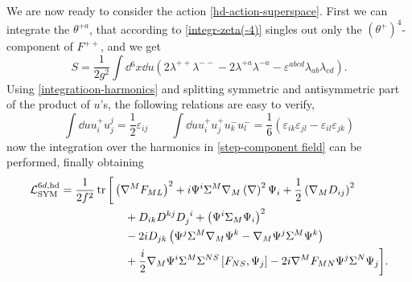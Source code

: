 


We are now ready to consider the action \eqref{hd-action-superspace}. First we can integrate the $\theta^{+a}$, that according to \eqref{integr-zeta(-4)} singles out only the $(\theta^+)^4$-component of $F^{++}$, and we get
\begin{equation}\label{step-component field}
S = \frac{1}{2 g^2}
\int \dd{^6 x} \dd{ u }
\left(
	2 \lambda^{++} \lambda^{--}
	-2 \lambda^{+a}  \lambda^{-a}
	- \varepsilon^{abcd} \lambda_{ab} \lambda_{cd}
\right).
\end{equation}
Using \eqref{integratioon-harmonics} and splitting symmetric and antisymmetric part of the product of $u$'s, the following relations are easy to verify,
\begin{equation}
\int \dd{ u } u^+_i u^j_j  = \frac{1}{2} \varepsilon_{ij}
\qquad
\int \dd{ u } u^+_i u^+_j  u^-_k u^-_l
	 =
\frac{1}{6} 
\left( \varepsilon_{ik} \varepsilon_{jl} -  \varepsilon_{il} \varepsilon_{jk}\right)
\end{equation}
now the integration over the harmonics in \eqref{step-component field} can be performed, finally obtaining
\begin{equation}\label{lagr-hd-sym-6d}
\begin{split}
	\Lagr_{\SYM}^{6d,\HD}
		=
	\frac{1}{2f^2}
		\tr \bigg[
	&			 \left( \covD^M F_{ML} \right)^2
				+ i \Psi^i \Sigma^M \covD_M
					\left( \covD \right)^2 \Psi_i
				+ \frac{1}{2} \left( \covD_M D_{ij} \right)^2
	\\
	&		\quad	
				+ D_{ik} D^{kj} D\indices{_j^i}
				+ \left( \Psi^i \Sigma_M \Psi_i \right)^2
	\\
	&		\quad
				- 2 iD_{jk}
					\left( \Psi^j \Sigma^M \covD_M  \Psi^k
						- \covD_M \Psi^j \Sigma^M \Psi^k \right)
	\\
	&		\quad
				+ \frac{i}{2}  \covD_M \Psi^i \Sigma^M \Sigma^{NS} 
					\left[ F_{NS} , \Psi_j \right]
				- 2i \covD^M F_{MN} \Psi^j \Sigma^N \Psi_j
			\bigg].
\end{split}
\end{equation}







